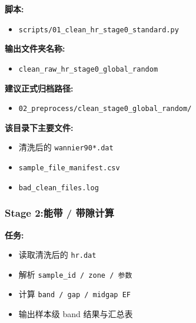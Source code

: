 \documentclass[lang=cn,scheme=chinese,color=blue,device=normal,toc=onecol,math=cm]{elegantbook}
\begin{document}
\textbf{脚本:}\par


\begin{itemize}
\item \texttt{scripts/\allowbreak{}01\_\allowbreak{}clean\_\allowbreak{}hr\_\allowbreak{}stage0\_\allowbreak{}standard.py}
\end{itemize}


\textbf{输出文件夹名称:}\par


\begin{itemize}
\item \texttt{clean\_\allowbreak{}raw\_\allowbreak{}hr\_\allowbreak{}stage0\_\allowbreak{}global\_\allowbreak{}random}
\end{itemize}


\textbf{建议正式归档路径:}\par


\begin{itemize}
\item \texttt{02\_\allowbreak{}preprocess/\allowbreak{}clean\_\allowbreak{}stage0\_\allowbreak{}global\_\allowbreak{}random/\allowbreak{}}
\end{itemize}


\textbf{该目录下主要文件:}\par


\begin{itemize}
\item 清洗后的 \texttt{wannier90*.dat}
\item \texttt{sample\_\allowbreak{}file\_\allowbreak{}manifest.csv}
\item \texttt{bad\_\allowbreak{}clean\_\allowbreak{}files.log}
\end{itemize}


\subsubsection{Stage 2:能带 /\allowbreak{} 带隙计算}


\textbf{任务:}\par


\begin{itemize}
\item 读取清洗后的 \texttt{hr.dat}
\item 解析 \texttt{sample\_\allowbreak{}id /\allowbreak{} zone /\allowbreak{} 参数}
\item 计算 \texttt{band /\allowbreak{} gap /\allowbreak{} midgap EF}
\item 输出样本级 band 结果与汇总表
\end{itemize}
\end{document}
